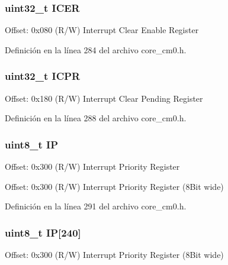 \subsubsection[{\texorpdfstring{I\+C\+ER}{ICER}}]{ uint32\+\_\+t I\+C\+ER}\hypertarget{struct_n_v_i_c___type_a5524644c804c18c22addd691d4da53e4}{}\label{struct_n_v_i_c___type_a5524644c804c18c22addd691d4da53e4}
Offset\+: 0x080 (R/W) Interrupt Clear Enable Register 

Definición en la línea 284 del archivo core\+\_\+cm0.\+h.

\subsubsection[{\texorpdfstring{I\+C\+PR}{ICPR}}]{ uint32\+\_\+t I\+C\+PR}\hypertarget{struct_n_v_i_c___type_a281c819da5f0f4265f5b88d269544bc9}{}\label{struct_n_v_i_c___type_a281c819da5f0f4265f5b88d269544bc9}
Offset\+: 0x180 (R/W) Interrupt Clear Pending Register 

Definición en la línea 288 del archivo core\+\_\+cm0.\+h.

\subsubsection[{\texorpdfstring{IP}{IP}}]{ uint8\+\_\+t IP}\hypertarget{struct_n_v_i_c___type_a519d82311efa6ead6f53b495d3d80de8}{}\label{struct_n_v_i_c___type_a519d82311efa6ead6f53b495d3d80de8}
Offset\+: 0x300 (R/W) Interrupt Priority Register

Offset\+: 0x300 (R/W) Interrupt Priority Register (8\+Bit wide) 

Definición en la línea 291 del archivo core\+\_\+cm0.\+h.

\subsubsection[{\texorpdfstring{IP}{IP}}]{ uint8\+\_\+t IP\mbox{[}240\mbox{]}}\hypertarget{struct_n_v_i_c___type_a38c377984f751265667317981f101bb4}{}\label{struct_n_v_i_c___type_a38c377984f751265667317981f101bb4}
Offset\+: 0x300 (R/W) Interrupt Priority Register (8\+Bit wide) 

